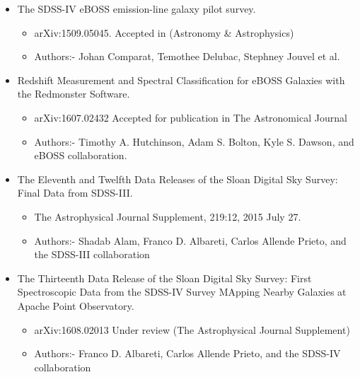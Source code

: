 \documentclass[letterpaper,11pt]{article}
\newcommand{\resitem}[1]{\item #1 \vspace{-2pt}}
\begin{document}
\begin{itemize}
\item
	 The SDSS-IV eBOSS emission-line galaxy pilot survey.\vspace*{-5pt}
         \begin{itemize}
		\resitem{arXiv:1509.05045. Accepted in (Astronomy \& Astrophysics)}
		\resitem{Authors:- Johan Comparat, Temothee Delubac, Stephney Jouvel et al.}
	\end{itemize}

\item
	 Redshift Measurement and Spectral Classification for eBOSS Galaxies with the Redmonster Software. \vspace*{-5pt}
         \begin{itemize}
		\resitem{arXiv:1607.02432 Accepted for publication in The Astronomical Journal}
		\resitem{Authors:- Timothy A. Hutchinson, Adam S. Bolton, Kyle S. Dawson, and eBOSS collaboration.}
	\end{itemize}

\item
	The Eleventh and Twelfth Data Releases of the Sloan Digital Sky Survey: Final Data from SDSS-III. \vspace*{-5pt}
         \begin{itemize}
		\resitem{The Astrophysical Journal Supplement, 219:12, 2015 July 27.}
		\resitem{Authors:- Shadab Alam, Franco D. Albareti, Carlos Allende Prieto, and the SDSS-III collaboration}
	\end{itemize}

\item
	The Thirteenth Data Release of the Sloan Digital Sky Survey: First Spectroscopic Data from the SDSS-IV Survey MApping Nearby Galaxies at Apache Point Observatory. \vspace*{-5pt}
         \begin{itemize}
		\resitem{arXiv:1608.02013 Under review (The Astrophysical Journal Supplement)}
		\resitem{Authors:- Franco D. Albareti, Carlos Allende Prieto, and the SDSS-IV collaboration}
	\end{itemize}








\end{itemize}\vspace*{-18pt}





\end{document}
